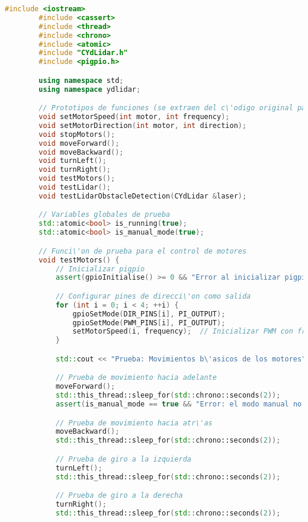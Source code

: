    \begin{lstlisting}[language={C++}, caption={C\'odigo de pruebas de integraci\'organismo}, label={Script}]
        #include <iostream>
        #include <cassert>
        #include <thread>
        #include <chrono>
        #include <atomic>
        #include "CYdLidar.h"
        #include <pigpio.h>

        using namespace std;
        using namespace ydlidar;

        // Prototipos de funciones (se extraen del c\'odigo original para modularizaci\'on)
        void setMotorSpeed(int motor, int frequency);
        void setMotorDirection(int motor, int direction);
        void stopMotors();
        void moveForward();
        void moveBackward();
        void turnLeft();
        void turnRight();
        void testMotors();
        void testLidar();
        void testLidarObstacleDetection(CYdLidar &laser);

        // Variables globales de prueba
        std::atomic<bool> is_running(true);
        std::atomic<bool> is_manual_mode(true);

        // Funci\'on de prueba para el control de motores
        void testMotors() {
            // Inicializar pigpio
            assert(gpioInitialise() >= 0 && "Error al inicializar pigpio.");

            // Configurar pines de direcci\'on como salida
            for (int i = 0; i < 4; ++i) {
                gpioSetMode(DIR_PINS[i], PI_OUTPUT);
                gpioSetMode(PWM_PINS[i], PI_OUTPUT);
                setMotorSpeed(i, frequency);  // Inicializar PWM con frecuencia inicial
            }

            std::cout << "Prueba: Movimientos b\'asicos de los motores" << std::endl;

            // Prueba de movimiento hacia adelante
            moveForward();
            std::this_thread::sleep_for(std::chrono::seconds(2));
            assert(is_manual_mode == true && "Error: el modo manual no est\'a activo durante la prueba de movimiento hacia adelante.");

            // Prueba de movimiento hacia atr\'as
            moveBackward();
            std::this_thread::sleep_for(std::chrono::seconds(2));

            // Prueba de giro a la izquierda
            turnLeft();
            std::this_thread::sleep_for(std::chrono::seconds(2));

            // Prueba de giro a la derecha
            turnRight();
            std::this_thread::sleep_for(std::chrono::seconds(2));


\end{lstlisting}
